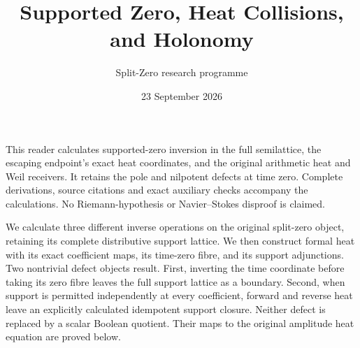 \documentclass[11pt,a4paper]{article}
\title{Supported Zero, Heat Collisions, and Holonomy}
\author{Split-Zero research programme}
\date{23 September 2026}
\theoremstyle{definition}\newtheorem{definition}[theorem]{Definition}
\newcommand{\B}{\mathbb B}\newcommand{\N}{\mathbb N}
\begin{document}
\maketitle
This reader calculates supported-zero inversion in the full semilattice,
the escaping endpoint's exact heat coordinates, and the original arithmetic
heat and Weil receivers. It retains the pole and nilpotent defects at time
zero. Complete derivations, source citations and exact auxiliary checks
accompany the calculations. No Riemann-hypothesis or Navier--Stokes
disproof is claimed.
\tableofcontents

\begingroup
\renewcommand{\B}{\mathbf B}



We calculate three different inverse operations on the original
split-zero object, retaining its complete distributive support lattice.
We then construct formal heat with its exact coefficient maps, its
time-zero fibre, and its support adjunctions.  Two nontrivial defect
objects result.  First, inverting the time coordinate before taking
its zero fibre leaves the full support lattice as a boundary.
Second, when support is permitted independently at every coefficient,
forward and reverse heat leave an explicitly calculated idempotent
support closure.  Neither defect is replaced by a scalar Boolean
quotient.  Their maps to the original amplitude heat equation are
proved below.
\end{document}
